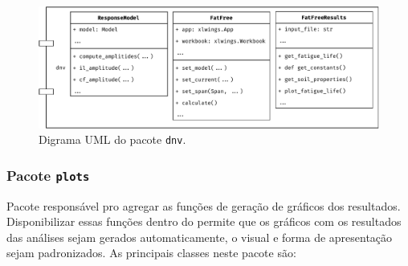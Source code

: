 \begin{figure}[!ht]
    \centering
    \caption{Digrama UML do pacote \texttt{dnv}.}\label{fig:dnv-uml}
    \includegraphics[width=\textwidth]{imagens/dnv-uml}
\end{figure}


\subsubsection{Pacote \texttt{plots}}


Pacote responsável pro agregar as funções de geração de gráficos dos resultados. Disponibilizar essas funções dentro do \frame permite que os gráficos com os resultados das análises sejam gerados automaticamente, o visual e forma de apresentação sejam padronizados. As principais classes neste pacote são:

